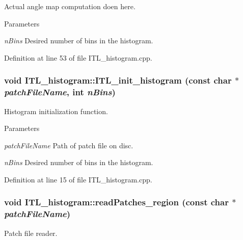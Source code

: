 Actual angle map computation doen here. 


\begin{DoxyParams}{Parameters}
\item[{\em nBins}]Desired number of bins in the histogram. \end{DoxyParams}


Definition at line 53 of file ITL\_\-histogram.cpp.

\hypertarget{classITL__histogram_a249b31d421d1568bd0e3e217e861582e}{
\subsubsection[{ITL\_\-init\_\-histogram}]{\setlength{\rightskip}{0pt plus 5cm}void ITL\_\-histogram::ITL\_\-init\_\-histogram (const char $\ast$ {\em patchFileName}, \/  int {\em nBins})}}
\label{classITL__histogram_a249b31d421d1568bd0e3e217e861582e}


Histogram initialization function. 


\begin{DoxyParams}{Parameters}
\item[{\em patchFileName}]Path of patch file on disc. \item[{\em nBins}]Desired number of bins in the histogram. \end{DoxyParams}


Definition at line 15 of file ITL\_\-histogram.cpp.

\hypertarget{classITL__histogram_a2e5cd6212ddb7688ec647cce780da882}{
\subsubsection[{readPatches\_\-region}]{\setlength{\rightskip}{0pt plus 5cm}void ITL\_\-histogram::readPatches\_\-region (const char $\ast$ {\em patchFileName})}}
\label{classITL__histogram_a2e5cd6212ddb7688ec647cce780da882}


Patch file reader. 


